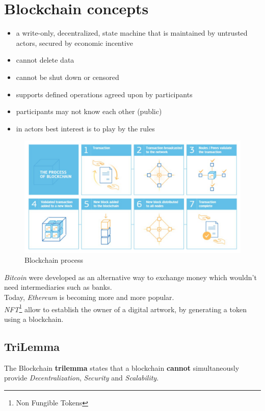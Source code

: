 \section{Blockchain concepts}
\begin{definition}[Blockchain]
\begin{itemize}
   \item a write-only, decentralized, state machine that is maintained by untrusted
   actors, secured by economic incentive
   \item cannot delete data
   \item cannot be shut down or censored
   \item supports defined operations agreed upon by participants
   \item participants may not know each other (public)
   \item in actors best interest is to play by the rules
\end{itemize}
\end{definition}
\begin{figure}[htbp]
   \centering
   \includegraphics{images/blockchain_process.png}
   \caption{Blockchain process}
   \label{fig:blockchain_process}
\end{figure}

\textit{Bitcoin} were developed as an alternative way to exchange money which wouldn't need intermediaries such as banks.\\
Today, \textit{Ethereum} is becoming more and more popular.\\
\textit{NFT}\footnote{Non Fungible Tokens} allow to establish the owner of a digital artwork, by generating a token using a blockchain.

\subsection{TriLemma}
The Blockchain \textbf{trilemma} states that a blockchain \textbf{cannot} simultaneously provide \textit{Decentralization}, \textit{Security} and \textit{Scalability}.

